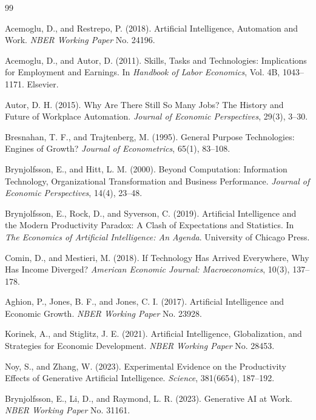 \begin{thebibliography}{99}

Acemoglu, D., and Restrepo, P. (2018).
Artificial Intelligence, Automation and Work.
\textit{NBER Working Paper} No. 24196.

Acemoglu, D., and Autor, D. (2011).
Skills, Tasks and Technologies: Implications for Employment and Earnings.
In \textit{Handbook of Labor Economics}, Vol. 4B, 1043--1171.
Elsevier.

Autor, D. H. (2015).
Why Are There Still So Many Jobs? The History and Future of Workplace Automation.
\textit{Journal of Economic Perspectives}, 29(3), 3--30.

Bresnahan, T. F., and Trajtenberg, M. (1995).
General Purpose Technologies: Engines of Growth?
\textit{Journal of Econometrics}, 65(1), 83--108.

Brynjolfsson, E., and Hitt, L. M. (2000).
Beyond Computation: Information Technology, Organizational Transformation and Business Performance.
\textit{Journal of Economic Perspectives}, 14(4), 23--48.

Brynjolfsson, E., Rock, D., and Syverson, C. (2019).
Artificial Intelligence and the Modern Productivity Paradox: A Clash of Expectations and Statistics.
In \textit{The Economics of Artificial Intelligence: An Agenda}.
University of Chicago Press.

Comin, D., and Mestieri, M. (2018).
If Technology Has Arrived Everywhere, Why Has Income Diverged?
\textit{American Economic Journal: Macroeconomics}, 10(3), 137--178.

Aghion, P., Jones, B. F., and Jones, C. I. (2017).
Artificial Intelligence and Economic Growth.
\textit{NBER Working Paper} No. 23928.

Korinek, A., and Stiglitz, J. E. (2021).
Artificial Intelligence, Globalization, and Strategies for Economic Development.
\textit{NBER Working Paper} No. 28453.

Noy, S., and Zhang, W. (2023).
Experimental Evidence on the Productivity Effects of Generative Artificial Intelligence.
\textit{Science}, 381(6654), 187--192.

Brynjolfsson, E., Li, D., and Raymond, L. R. (2023).
Generative AI at Work.
\textit{NBER Working Paper} No. 31161.


\end{thebibliography}
